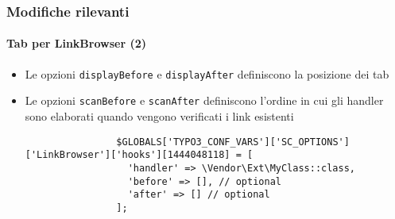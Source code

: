 \begin{frame}[fragile]
	\frametitle{Modifiche rilevanti}
	\framesubtitle{Tab per LinkBrowser (2)}

	\lstset{basicstyle=\tiny\ttfamily}

	\begin{itemize}

		\item Le opzioni \texttt{displayBefore} e \texttt{displayAfter} definiscono la posizione dei tab

		\item Le opzioni \texttt{scanBefore} e \texttt{scanAfter} definiscono l'ordine in cui gli handler sono
			elaborati quando vengono verificati i link esistenti

			\begin{lstlisting}
				$GLOBALS['TYPO3_CONF_VARS']['SC_OPTIONS']['LinkBrowser']['hooks'][1444048118] = [
				  'handler' => \Vendor\Ext\MyClass::class,
				  'before' => [], // optional
				  'after' => [] // optional
				];
			\end{lstlisting}

	\end{itemize}

\end{frame}


